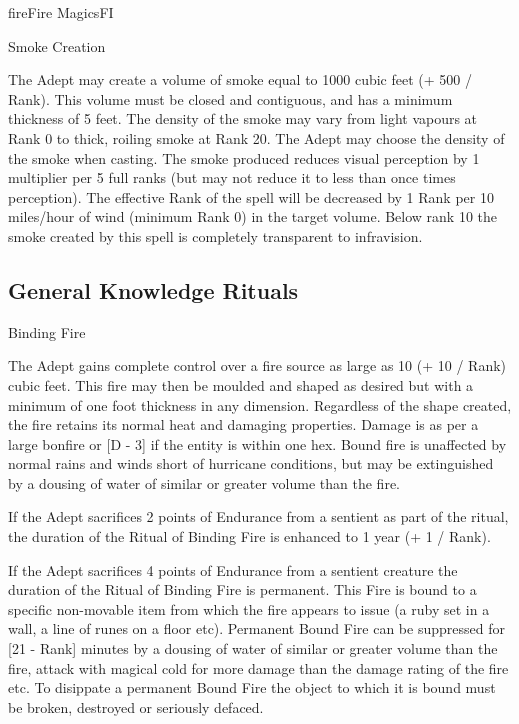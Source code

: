 \begin{college}[2.0]{fire}{Fire Magics}{FI}
\begin{spell}[G-8]{Smoke Creation}
\begin{effects}
The Adept may create a volume of smoke equal to 1000 cubic feet (+ 500
/ Rank). This volume must be closed and contiguous, and has a minimum
thickness of 5 feet. The density of the smoke may vary from light
vapours at Rank 0 to thick, roiling smoke at Rank 20. The Adept may
choose the density of the smoke when casting. The smoke produced
reduces visual perception by 1 multiplier per 5 full ranks (but may
not reduce it to less than once times perception). The effective Rank
of the spell will be decreased by 1 Rank per 10 miles/hour of wind
(minimum Rank 0) in the target volume. Below rank 10 the smoke created
by this spell is completely transparent to infravision.
\end{effects}
\end{spell}

\subsection{General Knowledge Rituals}

\begin{ritual}[Q-1]{Binding Fire}
\begin{effects}
The Adept gains complete control over a fire source as large as 10 (+
10 / Rank) cubic feet. This fire may then be moulded and shaped as
desired but with a minimum of one foot thickness in any dimension.
Regardless of the shape created, the fire retains its normal heat and
damaging properties. Damage is as per a large bonfire or [D - 3] if
the entity is within one hex. Bound fire is unaffected by normal rains
and winds short of hurricane conditions, but may be extinguished by a
dousing of water of similar or greater volume than the fire.

If the Adept sacrifices 2 points of Endurance from a sentient as part
of the ritual, the duration of the Ritual of Binding Fire is enhanced
to 1 year (+ 1 / Rank).

If the Adept sacrifices 4 points of Endurance from a sentient creature
the duration of the Ritual of Binding Fire is permanent. This Fire is
bound to a specific non-movable item from which the fire appears to
issue (\eg a ruby set in a wall, a line of runes on a floor etc).
Permanent Bound Fire can be suppressed for [21 - Rank] minutes by a
dousing of water of similar or greater volume than the fire, attack
with magical cold for more damage than the damage rating of the fire
etc. To disippate a permanent Bound Fire the object to which it is
bound must be broken, destroyed or seriously defaced.


\end{effects}
\end{ritual}
\end{college}
